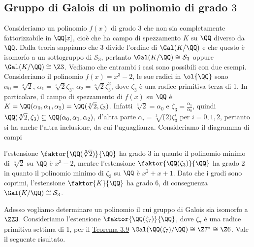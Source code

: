 \documentclass[11pt]{scrartcl}
\begin{document}
	\newpage
	
	\subsection{Gruppo di Galois di un polinomio di grado $3$}
	
	Consideriamo un polinomio $f(x)$ di grado 3 che non sia completamente fattorizzabile 
	in $\QQ[x]$, cioè che ha campo di spezzamento $K$ 
	su $\QQ$ diverso da $\QQ$. Dalla teoria sappiamo che 3 divide l'ordine di 
	$\Gal(K/\QQ)$ e che questo è isomorfo a un sottogruppo di 
	$\mathcal{S}_3$, pertanto $\Gal(K/\QQ) \cong \mathcal{S}_3$ oppure $\Gal(K/\QQ) \cong \Z3$. 
	Vediamo che entrambi i casi sono possibili con due esempi.
	\newline
	Consideriamo il polinomio $f(x) = x^3 - 2$, le sue radici in $\ol{\QQ}$ sono 
	$\alpha_0 = \sqrt[3]{2}$, $\alpha_1 = \sqrt[3]2 \zeta_3$,
	$\alpha_2 = \sqrt[3]2\zeta_3^2$, dove $\zeta_3$ è una radice primitiva terza 
	di 1. In particolare, il campo di spezzamento di $f(x)$ su $\QQ$
	è $K = \QQ(\alpha_0, \alpha_1, \alpha_2) = \QQ(\sqrt[3]2, \zeta_3)$. Infatti 
	$\sqrt[3]2 = \alpha_0$ e $\zeta_3 = \frac{\alpha_1}{\alpha_0}$,
	quindi $\QQ(\sqrt[3]2, \zeta_3) \subseteq \QQ(\alpha_0, \alpha_1, \alpha_2)$, 
	d'altra parte $\alpha_i = \sqrt[3](2)\zeta_3^i$ per 
	$i = 0, 1, 2$, pertanto si ha anche l'altra inclusione, da cui l'uguaglianza. 
	Consideriamo il diagramma di campi 
	\begin{center}
	\end{center}
	l'estensione $\faktor{\QQ(\sqrt[3]2)}{\QQ}$ ha grado 3 in quanto il 
	polinomio minimo di $\sqrt[3]2$ su $\QQ$ è $x^3 - 2$, mentre 
	l'estensione $\faktor{\QQ(\zeta_3)}{\QQ}$ ha grado 2 in quanto il polinomio
	minimo di $\zeta_3$ su $\QQ$ è $x^2 + x + 1$. Dato 
	che i gradi sono coprimi, l'estensione $\faktor{K}{\QQ}$ ha grado 6, di 
	conseguenza $\Gal(K/\QQ) \cong \mathcal{S}_3$.
	\newline
	
	Adesso vogliamo determinare un polinomio il cui gruppo di Galois sia 
	isomorfo a $\ZZ3$. Consideriamo l'estensione $\faktor{\QQ(\zeta_7)}{\QQ}$,
	dove $\zeta_7$ è una radice primitiva settima di 1, per il 
	\hyperref[teorema3.9]{Teorema 3.9} $\Gal(\QQ(\zeta_7)/\QQ) \cong \Z7^* \cong \Z6$.
	Vale il seguente risultato.
	
\end{document}
